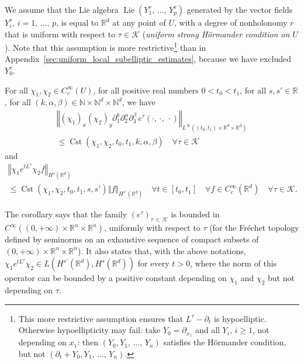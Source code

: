 \documentclass[AHL,Unicode,published]{cedram}
\newcommand*\R{\mathbb{R}}
\newcommand*\N{\mathbb{N}}
\newcommand{\calK}{\mathcal{K}}
\DeclareMathOperator{\Cst}{Cst}
\DeclareMathOperator{\Lie}{Lie}
\renewcommand{\geq}{\geqslant}
\renewcommand{\leq}{\leqslant}
\let\oldforall\forall
\renewcommand*{\forall}{\mathrel{\oldforall}}
\begin{document}
\begin{coro}\label{cor_heat_uniform}
We assume that the Lie algebra $\Lie(Y_1^\tau,\,\ldots,\,Y_p^\tau)$ generated by the vector fields $Y_i^\tau$, $i=1,\,\ldots,\,p$, is equal to $\R^d$ at any point of $U$, with a degree of nonholonomy $r$ that is uniform with respect to $\tau\in\calK$ (\emph{uniform strong H\"ormander condition on $U$}). Note that this assumption is more restrictive\footnote{This more restrictive assumption ensures that $L^\tau-\partial_t$ is hypoelliptic. Otherwise hypoellipticity may fail: take $Y_0=\partial_{x_1}$ and all $Y_i$, $i\geq 1$, not depending on $x_1$: then $(Y_0,Y_1,\,\ldots,\,Y_n)$ satisfies the H\"ormander condition, but not $(\partial_t+Y_0,Y_1,\,\ldots,\,Y_n)$.} than in Appendix~\ref{sec:uniform_local_subelliptic_estimates}, because we have excluded $Y_0^\tau$.

For all $\chi_1,\chi_2\in C_c^\infty(U)$, for all positive real numbers $0<t_0<t_1$, for all $s,s'\in\R$, for all $(k,\alpha,\beta)\in\N\times\N^d\times\N^d$, we have
\begin{multline}\label{cor_heat_uniform_e}
\left\Vert (\chi_1)_x (\chi_2)_y \partial_1^k \partial_2^\alpha \partial_3^\beta \, e^\tau(\cdot,\,\cdot,\,\cdot) \right\Vert_{L^\infty\left((t_0,t_1)\times\R^d\times\R^d\right)}\\
\leq \Cst\left(\chi_1,\chi_2,t_0,t_1,k,\alpha,\beta\right)
\quad \forall \tau\in\calK
\end{multline}
and
\begin{multline*}
\left\Vert \chi_1 e^{t L^\tau}\chi_2 f\right\Vert_{H^s\left(\R^d\right)}\\
\leq \Cst\left(\chi_1,\chi_2,t_0,t_1,s,s'\right) \Vert f\Vert_{H^{s'}\left(\R^d\right)}
\quad\forall t\in[t_0,t_1]\quad \forall f\in C_c^\infty\left(\R^d\right)\quad \forall \tau\in\calK.
\end{multline*}
\end{coro}

The corollary says that the family $(e^\tau)_{\tau\,\in\,\calK}$ is bounded in $C^{\infty}((0,+\infty)\times\R^n\times\R^n)$, uniformly with respect to $\tau$ (for the Fréchet topology defined by seminorms on an exhaustive sequence of compact subsets of $(0,+\infty)\times\R^n\times\R^n$). It also states that, with the above notations, $\chi_1 e^{t L^\tau} \chi_2 \in L(H^{s'}(\R^d),H^s(\R^d))$ for every $t>0$, where the norm of this operator can be bounded by a positive constant depending on $\chi_1$ and $\chi_2$ but not depending on $\tau$.
\end{document}
